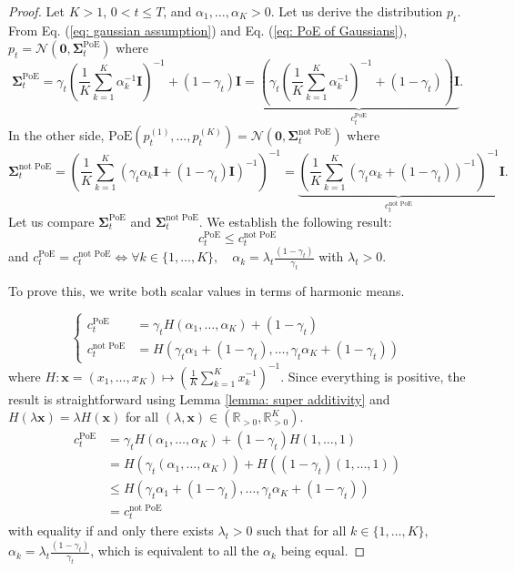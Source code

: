 \documentclass[10pt]{article} %
\def\rvx{{\mathbf{x}}}
\begin{document}
\begin{proof}
Let $K>1$, $0 < t \leq T$, and $\alpha_1,\dots,\alpha_K > 0$. Let us derive the distribution $p_t$. From Eq. (\ref{eq: gaussian assumption}) and Eq. (\ref{eq: PoE of Gaussians}),  $p_t = \mathcal{N}(\bm{0},\bm{\Sigma}^{\text{PoE}}_t)$ where
\begin{equation}
\bm{\Sigma}^{\text{PoE}}_t = \gamma_t (\frac{1}{K} \sum_{k=1}^K \alpha_k^{-1}\bm{I})^{-1} + (1 - \gamma_t)\bm{I} = \underbrace{\left(\gamma_t(\frac{1}{K} \sum_{k=1}^K \alpha_k^{-1})^{-1} + (1 - \gamma_t)\right)\bm{I}}_{c^{\text{PoE}}_t}.
\end{equation}
In the other side, $\text{PoE}(p^{(1)}_t,\dots,p^{(K)}_t) = \mathcal{N}(\bm{0},\bm{\Sigma}^{\text{not PoE}}_t)$ where
\begin{equation}
\bm{\Sigma}^{\text{not PoE}}_t =  \left( \frac{1}{K} \sum_{k=1}^K (\gamma_t \alpha_k \bm{I} + (1 - \gamma_t)\bm{I})^{-1}\right)^{-1} =  \underbrace{\left(  \frac{1}{K} \sum_{k=1}^K (\gamma_t \alpha_k  + (1 - \gamma_t))^{-1}\right)^{-1}}_{c^{\text{not PoE}}_t}\bm{I} .
\end{equation}
Let us compare $\bm{\Sigma}^{\text{PoE}}_t$ and $\bm{\Sigma}^{\text{not PoE}}_t$. We establish the following result:
\begin{equation}c_t^{\text{PoE}} \leq c_t^{\text{not PoE}}
\end{equation}
and $c_t^{\text{PoE}} = c_t^{\text{not PoE}} \Leftrightarrow \forall k \in \{1,\dots,K\}, \quad \alpha_k = \lambda_t \frac{(1-\gamma_t)}{\gamma_t}$ with $\lambda_t > 0$.

To prove this, we write both scalar values in terms of harmonic means.

\begin{equation}
\begin{cases}
c_t^{\text{PoE}} & = \gamma_t H(\alpha_1,\dots,\alpha_K) + (1 - \gamma_t)  \\
c_t^{\text{not PoE}} & = H(\gamma_t\alpha_1 + (1-\gamma_t),\dots,\gamma_t \alpha_K + (1-\gamma_t))
\end{cases}
\end{equation}
where $H: \rvx = (x_1,\dots,x_K) \mapsto (\frac{1}{K}\sum_{k=1}^K x^{-1}_k)^{-1}$. Since everything is positive, the result is straightforward using Lemma \ref{lemma: super additivity} and $H(\lambda\rvx) = \lambda H(\rvx)$ for all $(\lambda,\rvx) \in (\mathbb{R}_{>0},\mathbb{R}^K_{>0})$.
\begin{align}
c_t^{\text{PoE}} & = \gamma_t H(\alpha_1,\dots,\alpha_K) + (1 - \gamma_t)H(1,\dots,1) \\
& = H(\gamma_t (\alpha_1,\dots,\alpha_K)) + H((1 - \gamma_t) (1,\dots,1)) \\
& \leq H(\gamma_t\alpha_1 + (1-\gamma_t),\dots,\gamma_t \alpha_K + (1-\gamma_t)) \\
& = c_t^{\text{not PoE}}
\end{align}
with equality if and only there exists $\lambda_t > 0$ such that for all $k \in \{1,\dots,K\}$, $ \alpha_k = \lambda_t\frac{(1-\gamma_t)}{\gamma_t}$, which is equivalent to all the $\alpha_k$ being equal.
\end{proof}
\end{document}

